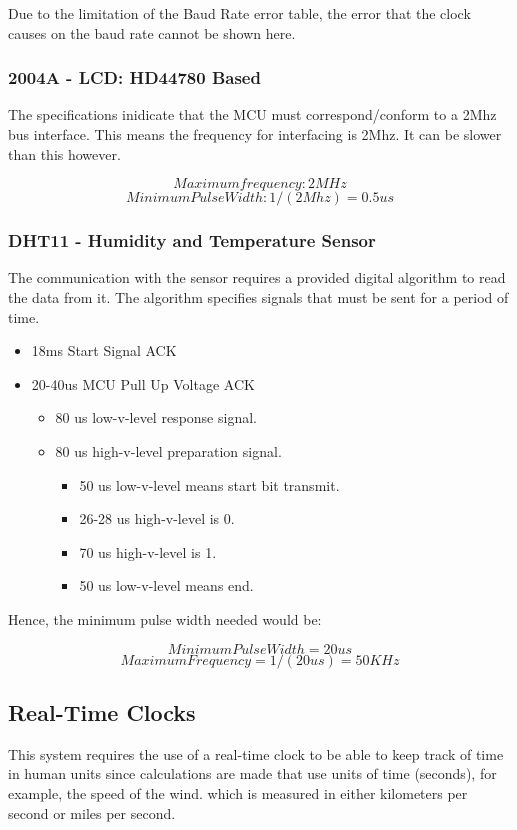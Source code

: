 			Due to the limitation of the Baud Rate error table, the error that the clock causes on the baud rate cannot be shown here.

		\subsubsection{2004A - LCD: HD44780 Based}
			The specifications inidicate that the MCU must correspond/conform to a 2Mhz bus interface. This means the frequency for interfacing is 2Mhz. It can be slower than this however.

				$$ Maximum frequency: 2 MHz $$
				$$ Minimum Pulse Width: 1/(2Mhz)= 0.5 us $$


		\subsubsection{DHT11 - Humidity and Temperature Sensor}
			The communication with the sensor requires a provided digital algorithm to read the data from it. The algorithm specifies signals that must be sent for a period of time.

			\begin{itemize}
				\item 18ms Start Signal ACK
				\item 20-40us MCU Pull Up Voltage ACK
				\begin{itemize}
					\item 80 us low-v-level response signal.
					\item 80 us high-v-level preparation signal.
					\begin{itemize}
						\item 50 us low-v-level means start bit transmit.
						\item 26-28 us high-v-level is 0.
						\item 70 us high-v-level is 1.
						\item 50 us	low-v-level means end.
					\end{itemize}
				\end{itemize}
			\end{itemize}

			Hence, the minimum pulse width needed would be:

			$$ Minimum Pulse Width = 20us $$
			$$ Maximum Frequency = 1/(20us) = 50 KHz $$

	\subsection{Real-Time Clocks}
		This system requires the use of a real-time clock to be able to keep track of time in human units since calculations are made that use units of time (seconds), for example, the speed of the wind. which is measured
		in either kilometers per second or miles per second.

